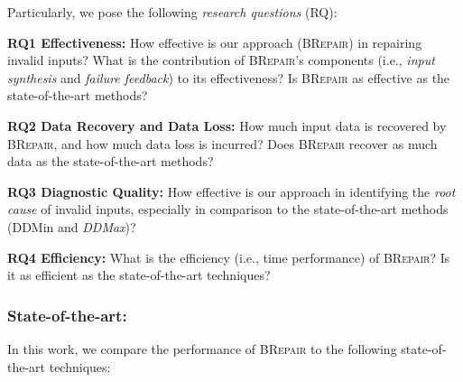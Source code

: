 \documentclass[sigconf,review,anonymous]{acmart}
\newcommand{\recheck}[1]{\textcolor{red}{#1}}
\newcommand{\revise}[1]{\textcolor{blue}{#1}}
\newcommand{\ddmin}{\textit{ddmin}\xspace}
\newcommand{\approach}{\textsc{BRepair}\xspace}
\def\ddmin{DDMin\xspace}
\newcommand{\ddmax}{\textit{DDMax}\xspace}
\begin{document}
Particularly,
we pose the following \textit{research questions} (RQ):

\noindent
\textbf{RQ1 Effectiveness:}  %
How effective is our approach (\approach) in repairing invalid %
inputs? What is the contribution of \approach 's components (i.e., \textit{input synthesis} and \textit{failure feedback}) to its effectiveness?
Is \approach %
as effective as %
the state-of-the-art methods?

\noindent
\textbf{RQ2 Data Recovery and Data Loss:}
How much input data is recovered by \approach, and how much data loss is incurred?  Does \approach recover as much data as %
the state-of-the-art methods?


\noindent
\textbf{RQ3 Diagnostic Quality:}
How effective is our approach in identifying the \textit{root cause} of invalid inputs, especially in comparison to the state-of-the-art methods (\ddmin and \ddmax)?
%

\noindent
\textbf{RQ4 Efficiency:} %
What is the efficiency (i.e., time performance) of
\approach? Is it as efficient as %
the state-of-the-art %
techniques?


\subsubsection*{\bf State-of-the-art:}
In this work, we compare the performance of \approach to the following state-of-the-art techniques: %
\end{document}
